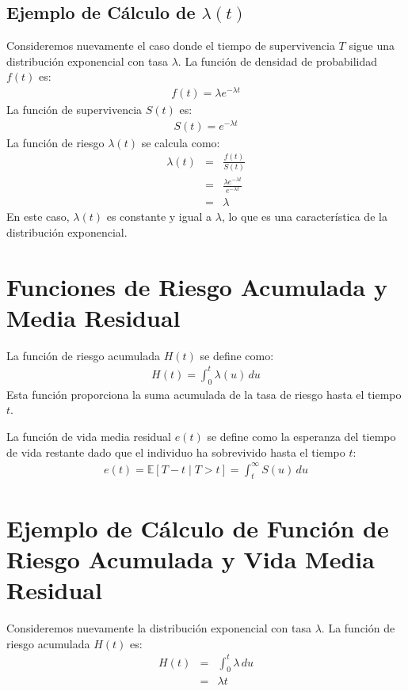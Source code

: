 \documentclass[a4paper]{report} %
\begin{document}
\subsection{Ejemplo de C\'alculo de $\lambda(t)$}
Consideremos nuevamente el caso donde el tiempo de supervivencia $T$ sigue una distribuci\'on exponencial con tasa $\lambda$. La funci\'on de densidad de probabilidad $f(t)$ es:
\begin{eqnarray*}
f(t) = \lambda e^{-\lambda t}
\end{eqnarray*}
La funci\'on de supervivencia $S(t)$ es:
\begin{eqnarray*}
S(t) = e^{-\lambda t}
\end{eqnarray*}
La funci\'on de riesgo $\lambda(t)$ se calcula como:
\begin{eqnarray*}
\lambda(t) &=& \frac{f(t)}{S(t)} \\
           &=& \frac{\lambda e^{-\lambda t}}{e^{-\lambda t}} \\
           &=& \lambda
\end{eqnarray*}
En este caso, $\lambda(t)$ es constante y igual a $\lambda$, lo que es una caracter\'istica de la distribuci\'on exponencial.

\section{Funciones de Riesgo Acumulada y Media Residual}
La funci\'on de riesgo acumulada $H(t)$ se define como:
\begin{eqnarray*}
H(t) = \int_0^t \lambda(u) \, du
\end{eqnarray*}
Esta funci\'on proporciona la suma acumulada de la tasa de riesgo hasta el tiempo $t$.

La funci\'on de vida media residual $e(t)$ se define como la esperanza del tiempo de vida restante dado que el individuo ha sobrevivido hasta el tiempo $t$:
\begin{eqnarray*}
e(t) = \mathbb{E}[T - t \mid T > t] = \int_t^\infty S(u) \, du
\end{eqnarray*}

\section{Ejemplo de C\'alculo de Funci\'on de Riesgo Acumulada y Vida Media Residual}
Consideremos nuevamente la distribuci\'on exponencial con tasa $\lambda$. La funci\'on de riesgo acumulada $H(t)$ es:
\begin{eqnarray*}
H(t) &=& \int_0^t \lambda \, du \\
     &=& \lambda t
\end{eqnarray*}
\end{document}
